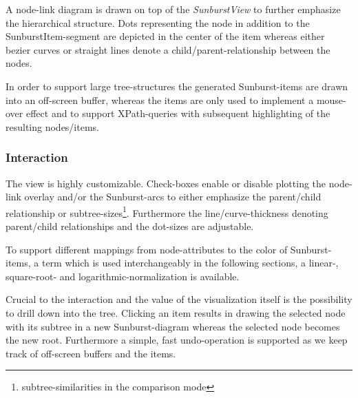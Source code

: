 \begin{itemize}
A node-link diagram is drawn on top of the \emph{SunburstView} to further emphasize the hierarchical structure. Dots representing the node in addition to the SunburstItem-segment are depicted in the center of the item whereas either bezier curves or straight lines denote a child/parent-relationship between the nodes.

In order to support large tree-structures the generated Sunburst-items are drawn into an off-screen buffer, whereas the items are only used to implement a mouse-over effect and to support XPath-queries with subsequent highlighting of the resulting nodes/items.

\subsubsection{Interaction}
The view is highly customizable. Check-boxes enable or disable plotting the node-link overlay and/or the Sunburst-arcs to either emphasize the parent/child relationship or subtree-sizes\footnote{subtree-similarities in the comparison mode}. Furthermore the line/curve-thickness denoting parent/child relationships and the dot-sizes are adjustable.




To support different mappings from node-attributes to the color of Sunburst-items, a term which is used interchangeably in the following sections, a linear-, square-root- and logarithmic-normalization is available.

Crucial to the interaction and the value of the visualization itself is the possibility to drill down into the tree. Clicking an item results in drawing the selected node with its subtree in a new Sunburst-diagram whereas the selected node becomes the new root. Furthermore a simple, fast undo-operation is supported as we keep track of off-screen buffers and the items. %


\end{itemize}
